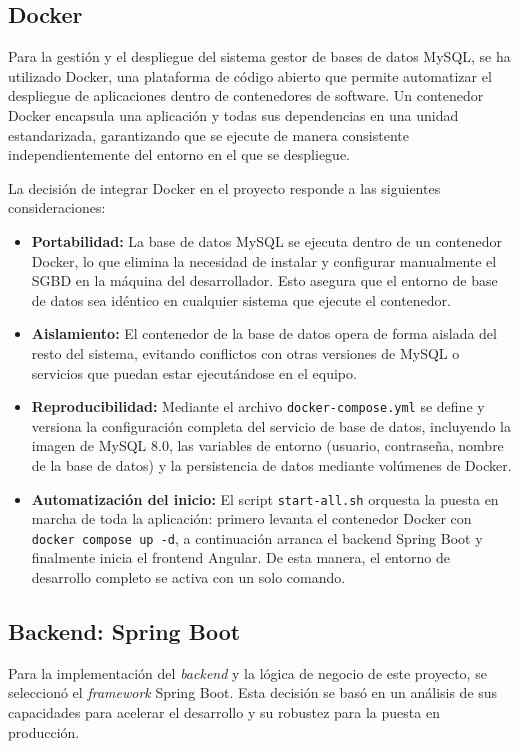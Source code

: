 \subsection{Docker}
Para la gestión y el despliegue del sistema gestor de bases de datos MySQL, se ha utilizado Docker, una plataforma de código abierto que permite automatizar el despliegue de aplicaciones dentro de contenedores de software. Un contenedor Docker encapsula una aplicación y todas sus dependencias en una unidad estandarizada, garantizando que se ejecute de manera consistente independientemente del entorno en el que se despliegue.

La decisión de integrar Docker en el proyecto responde a las siguientes consideraciones:

\begin{itemize}
    \item \textbf{Portabilidad:} La base de datos MySQL se ejecuta dentro de un contenedor Docker, lo que elimina la necesidad de instalar y configurar manualmente el SGBD en la máquina del desarrollador. Esto asegura que el entorno de base de datos sea idéntico en cualquier sistema que ejecute el contenedor.
    \item \textbf{Aislamiento:} El contenedor de la base de datos opera de forma aislada del resto del sistema, evitando conflictos con otras versiones de MySQL o servicios que puedan estar ejecutándose en el equipo.
    \item \textbf{Reproducibilidad:} Mediante el archivo \texttt{docker-compose.yml} se define y versiona la configuración completa del servicio de base de datos, incluyendo la imagen de MySQL 8.0, las variables de entorno (usuario, contraseña, nombre de la base de datos) y la persistencia de datos mediante volúmenes de Docker.
    \item \textbf{Automatización del inicio:} El script \texttt{start-all.sh} orquesta la puesta en marcha de toda la aplicación: primero levanta el contenedor Docker con \texttt{docker compose up -d}, a continuación arranca el backend Spring Boot y finalmente inicia el frontend Angular. De esta manera, el entorno de desarrollo completo se activa con un solo comando.
\end{itemize}

\subsection{Backend: Spring Boot}
Para la implementación del \textit{backend} y la lógica de negocio de este proyecto, se seleccionó el \textit{framework} Spring Boot. Esta decisión se basó en un análisis de sus capacidades para acelerar el desarrollo y su robustez para la puesta en producción.

